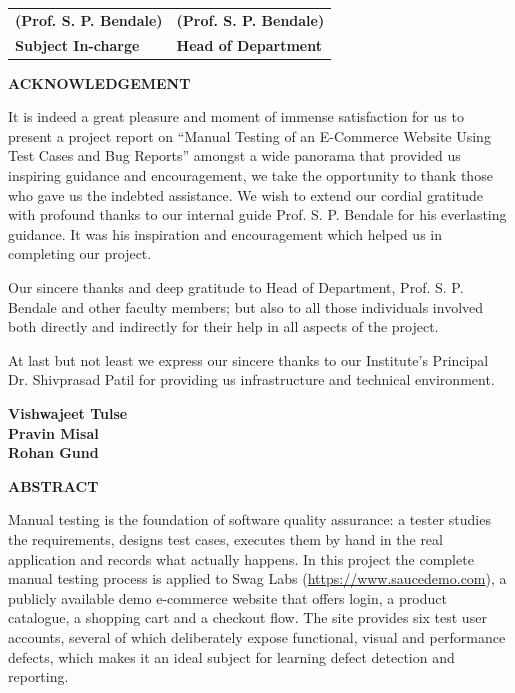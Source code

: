 \documentclass[12pt,a4paper]{article}
\newcommand{\ptitle}{Manual Testing of an E-Commerce Website Using Test Cases and Bug Reports}
\begin{document}
\begin{tabular}{p{7cm}p{7cm}}
\textbf{(Prof. S. P. Bendale)} & \textbf{(Prof. S. P. Bendale)}\\[0.3cm]
\textbf{Subject In-charge} & \textbf{Head of Department}\\
\end{tabular}
\newpage

\begin{center}{\large\bfseries ACKNOWLEDGEMENT}\end{center}
\vspace{0.3cm}
It is indeed a great pleasure and moment of immense satisfaction for us to present a project report on ``\ptitle'' amongst a wide panorama that provided us inspiring guidance and encouragement, we take the opportunity to thank those who gave us the indebted assistance. We wish to extend our cordial gratitude with profound thanks to our internal guide Prof. S. P. Bendale for his everlasting guidance. It was his inspiration and encouragement which helped us in completing our project.

Our sincere thanks and deep gratitude to Head of Department, Prof. S. P. Bendale and other faculty members; but also to all those individuals involved both directly and indirectly for their help in all aspects of the project.

At last but not least we express our sincere thanks to our Institute's Principal Dr. Shivprasad Patil for providing us infrastructure and technical environment.
\vspace{1.5cm}

\begin{flushright}
\textbf{Vishwajeet Tulse}\\
\textbf{Pravin Misal}\\
\textbf{Rohan Gund}
\end{flushright}
\newpage

\begin{center}{\large\bfseries ABSTRACT}\end{center}
Manual testing is the foundation of software quality assurance: a tester studies the requirements, designs test cases, executes them by hand in the real application and records what actually happens. In this project the complete manual testing process is applied to Swag Labs (\url{https://www.saucedemo.com}), a publicly available demo e-commerce website that offers login, a product catalogue, a shopping cart and a checkout flow. The site provides six test user accounts, several of which deliberately expose functional, visual and performance defects, which makes it an ideal subject for learning defect detection and reporting.
\end{document}

